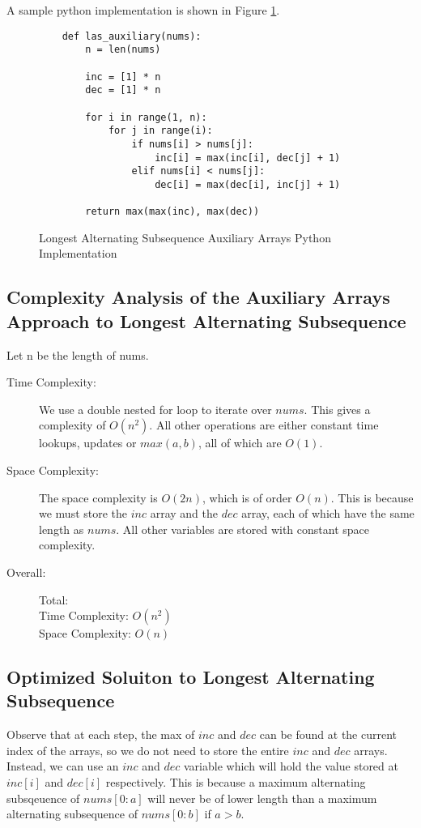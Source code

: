 A sample python implementation is shown in Figure \ref{fig:las-auxiliary}.

\begin{figure}[H]
    \centering
    \begin{lstlisting}
    def las_auxiliary(nums):
        n = len(nums)
        
        inc = [1] * n
        dec = [1] * n
    
        for i in range(1, n):
            for j in range(i):
                if nums[i] > nums[j]:
                    inc[i] = max(inc[i], dec[j] + 1)
                elif nums[i] < nums[j]:
                    dec[i] = max(dec[i], inc[j] + 1)

        return max(max(inc), max(dec))
    \end{lstlisting}
    \caption{Longest Alternating Subsequence Auxiliary Arrays Python Implementation}
    \label{fig:las-auxiliary}
\end{figure}
\newpage

\subsection{Complexity Analysis of the Auxiliary Arrays Approach to Longest Alternating Subsequence}
Let n be the length of nums.
\begin{description}
    \item[Time Complexity:]
        We use a double nested for loop to iterate over $nums$.
        This gives a complexity of $O(n^2)$.
        All other operations are either constant time lookups, updates or $max(a,b)$,
        all of which are $O(1)$.
        
    \item[Space Complexity:] 
        The space complexity is $O(2n)$, which is of order $O(n)$.
        This is because we must store the $inc$ array and the $dec$ array,
        each of which have the same length as $nums$.
        All other variables are stored with constant space complexity.

        
    \item[Overall:] Total:\\
        Time Complexity: $O(n^2)$\\
        Space Complexity: $O(n)$
    
\end{description}


\subsection{Optimized Soluiton to Longest Alternating Subsequence}
Observe that at each step, the max of $inc$ and $dec$ can be found at the current index of the arrays,
so we do not need to store the entire $inc$ and $dec$ arrays.
Instead, we can use an $inc$ and $dec$ variable which will hold the value stored at $inc[i]$ and $dec[i]$ respectively.
This is because a maximum alternating subsqeuence of $nums[0:a]$ will never be of lower length than a maximum alternating subsequence of $nums[0:b]$ if $a > b$.


